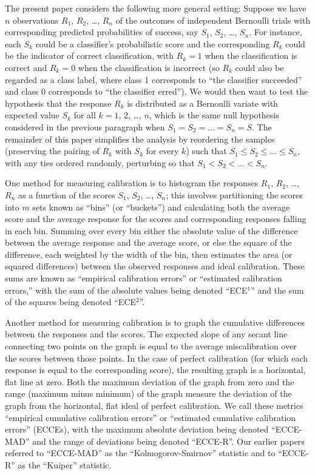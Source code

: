 \documentclass{article}
\begin{document}
The present paper considers the following more general setting:
Suppose we have $n$ observations $R_1$, $R_2$, \dots, $R_n$
of the outcomes of independent Bernoulli trials
with corresponding predicted probabilities
of success, say $S_1$, $S_2$, \dots, $S_n$.
For instance, each $S_k$ could be a classifier's probabilistic score
and the corresponding $R_k$ could be the indicator of correct classification,
with $R_k = 1$ when the classification is correct
and $R_k = 0$ when the classification is incorrect
(so $R_k$ could also be regarded as a class label,
where class 1 corresponds to ``the classifier succeeded''
and class 0 corresponds to ``the classifier erred'').
We would then want to test the hypothesis that the response $R_k$
is distributed as a Bernoulli variate with expected value $S_k$
for all $k = 1$, $2$, \dots, $n$, which is the same null hypothesis
considered in the previous paragraph when $S_1 = S_2 = \dots = S_n = S$.
The remainder of this paper simplifies the analysis by reordering the samples
(preserving the pairing of $R_k$ with $S_k$ for every $k$)
such that $S_1 \le S_2 \le \dots \le S_n$, with any ties ordered randomly,
perturbing so that $S_1 < S_2 < \dots < S_n$.

One method for measuring calibration is to histogram the responses
$R_1$, $R_2$, \dots, $R_n$ as a function of the scores
$S_1$, $S_2$, \dots, $S_n$; this involves partitioning the scores
into $m$ sets known as ``bins'' (or ``buckets'')
and calculating both the average score and the average response
for the scores and corresponding responses falling in each bin.
Summing over every bin either the absolute value of the difference
between the average response and the average score,
or else the square of the difference, each weighted by the width of the bin,
then estimates the area (or squared differences) between the observed responses
and ideal calibration. These sums are known as ``empirical calibration errors''
or ``estimated calibration errors,'' with the sum of the absolute values
being denoted ``ECE$^1$'' and the sum of the squares being denoted ``ECE$^2$''.

Another method for measuring calibration is to graph the cumulative differences
between the responses and the scores.
The expected slope of any secant line connecting two points on the graph
is equal to the average miscalibration over the scores between those points.
In the case of perfect calibration (for which each response
is equal to the corresponding score), the resulting graph
is a horizontal, flat line at zero.
Both the maximum deviation of the graph from zero and the range
(maximum minus minimum) of the graph measure the deviation
of the graph from the horizontal, flat ideal of perfect calibration.
We call these metrics ``empirical cumulative calibration errors''
or ``estimated cumulative calibration errors'' (ECCEs),
with the maximum absolute deviation being denoted ``ECCE-MAD''
and the range of deviations being denoted ``ECCE-R''.
Our earlier papers referred to ``ECCE-MAD''
as the ``Kolmogorov-Smirnov'' statistic
and to ``ECCE-R'' as the ``Kuiper'' statistic.
\end{document}
